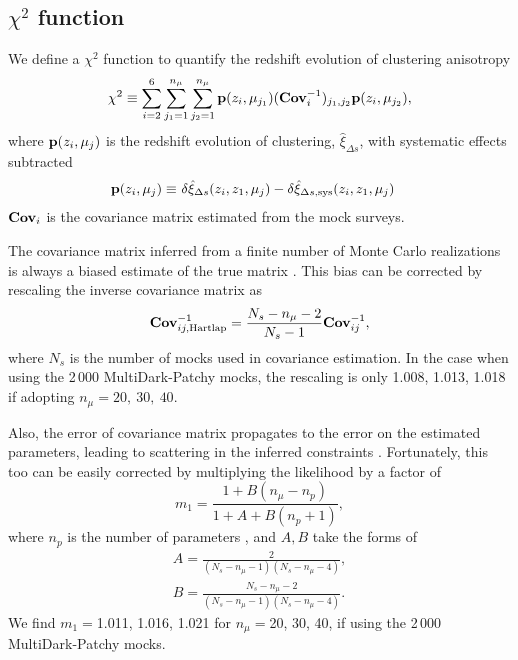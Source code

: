 \documentclass[iop]{emulateapj}
\begin{document}
\subsection{$\chi^2$ function}\label{sec:likelihood}

We define a $\chi^2$ function to quantify the redshift evolution of clustering anisotropy
\begin{equation}\label{eq:chisq1}
\chi^2\equiv \sum_{i=2}^{6} \sum_{j_1=1}^{n_{\mu}} \sum_{j_2=1}^{n_{\mu}} {\bf p}(z_i,\mu_{j_1}) ({\bf Cov}_{i}^{-1})_{j_1,j_2}  {\bf p}(z_i,\mu_{j_2}),
\end{equation}
where ${\bf p}(z_i,\mu_{j})$ is the redshift evolution of clustering, 
$\hat \xi_{\Delta s}$, with systematic effects subtracted
\begin{eqnarray}\label{eq:bfp}
 {\bf p}(z_i,\mu_{j}) \equiv&\ \delta \hat\xi_{\Delta s}(z_i,z_1,\mu_j) - \delta \hat\xi_{\Delta s, \rm sys}(z_i,z_1,\mu_j)
\end{eqnarray}
${\bf Cov}_i$ is the covariance matrix estimated from the mock surveys. %

The covariance matrix inferred from a finite number of 
Monte Carlo realizations 
is always a biased estimate of the true matrix \citep{Hartlap}.
This bias can be corrected by rescaling the inverse covariance matrix as 
\begin{equation}
 {\bf Cov}^{-1}_{ij,\rm Hartlap} = \frac{N_s - n_{\mu}-2}{N_s-1} {\bf Cov}^{-1}_{ij},
\end{equation}
where $N_s$ is the number of mocks used in covariance estimation.
In the case when using the 2\,000 MultiDark-Patchy mocks, 
the rescaling is only 1.008, 1.013, 1.018 if adopting $n_{\mu}=20,\ 30, \ 40$.

Also, the error of covariance matrix propagates to the 
error on the estimated parameters, 
leading to scattering in the inferred constraints \citep{Percival2014}.
Fortunately, this too can be easily corrected by multiplying the likelihood by a factor of
\begin{equation}
m_1 = \frac{1+B(n_\mu - n_{p})}{1+A+B(n_p +1)},
\end{equation}
where $n_p$ is the number of parameters , and $A,B$ take the forms of
\begin{eqnarray}
A = \frac{2}{(N_s-n_\mu-1)(N_s-n_\mu-4)},\\
B = \frac{N_s-n_\mu-2}{(N_s-n_\mu-1)(N_s-n_\mu-4)}.
\end{eqnarray}
We find $m_1=$1.011, 1.016, 1.021 for $n_{\mu}=$20, 30, 40, if using the 2\,000 MultiDark-Patchy mocks.
\end{document}

